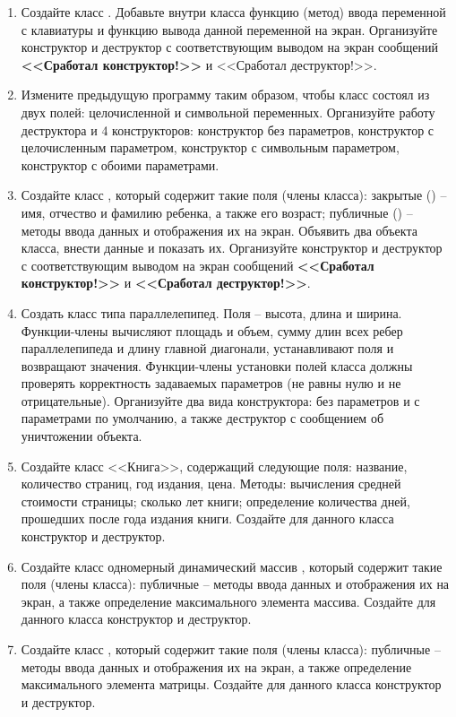 \begin{enumerate}[leftmargin=*]
    \item Создайте класс . Добавьте внутри класса функцию (метод) ввода переменной с клавиатуры и функцию вывода данной переменной на экран. Организуйте конструктор и деструктор с соответствующим выводом на экран сообщений \textbf{<<Сработал конструктор!>>} и <<Сработал деструктор!>>.
    \item Измените предыдущую программу таким образом, чтобы класс  состоял из двух полей: целочисленной и символьной переменных. Организуйте работу деструктора и 4 конструкторов: конструктор без параметров, конструктор с целочисленным параметром, конструктор с символьным параметром, конструктор с обоими параметрами. 
    \item Создайте класс , который содержит такие поля (члены класса): закрытые () – имя, отчество и фамилию ребенка, а также его возраст; публичные () – методы ввода данных и отображения их на экран. Объявить два объекта класса, внести данные и показать их. Организуйте конструктор и деструктор с соответствующим выводом на экран сообщений \textbf{<<Сработал конструктор!>>} и \textbf{<<Сработал деструктор!>>}.
    \item Создать класс типа параллелепипед. Поля – высота, длина и ширина. Функции-члены вычисляют площадь и объем, сумму длин всех ребер параллелепипеда и длину главной диагонали, устанавливают поля и возвращают значения. Функции-члены установки полей класса должны проверять корректность задаваемых параметров (не равны нулю и не отрицательные). Организуйте два вида конструктора: без параметров и с параметрами по умолчанию, а также деструктор с сообщением об уничтожении объекта.
    \item Создайте класс <<Книга>>, содержащий следующие поля: название, количество страниц, год издания, цена. Методы: вычисления средней стоимости страницы; сколько лет книги; определение количества дней, прошедших после года издания книги. Создайте для данного класса конструктор и деструктор.
    \item Создайте класс одномерный динамический массив , который содержит такие поля (члены класса): публичные – методы ввода данных и отображения их на экран, а также определение максимального элемента массива. Создайте для данного класса конструктор и деструктор.
    \item Создайте класс , который содержит такие поля (члены класса): публичные – методы ввода данных и отображения их на экран, а также определение максимального элемента матрицы. Создайте для данного класса конструктор и деструктор.

\end{enumerate}
